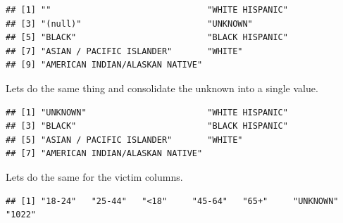 \documentclass[
]{article}
\newenvironment{Shaded}{\begin{snugshade}}{\end{snugshade}}
\newcommand{\CommentTok}[1]{\textcolor[rgb]{0.56,0.35,0.01}{\textit{#1}}}
\newcommand{\FunctionTok}[1]{\textcolor[rgb]{0.13,0.29,0.53}{\textbf{#1}}}
\newcommand{\NormalTok}[1]{#1}
\newcommand{\OtherTok}[1]{\textcolor[rgb]{0.56,0.35,0.01}{#1}}
\newcommand{\SpecialCharTok}[1]{\textcolor[rgb]{0.81,0.36,0.00}{\textbf{#1}}}
\newcommand{\StringTok}[1]{\textcolor[rgb]{0.31,0.60,0.02}{#1}}
\begin{document}
\begin{verbatim}
## [1] ""                               "WHITE HISPANIC"                
## [3] "(null)"                         "UNKNOWN"                       
## [5] "BLACK"                          "BLACK HISPANIC"                
## [7] "ASIAN / PACIFIC ISLANDER"       "WHITE"                         
## [9] "AMERICAN INDIAN/ALASKAN NATIVE"
\end{verbatim}

Lets do the same thing and consolidate the unknown into a single value.

\begin{Shaded}
\end{Shaded}

\begin{verbatim}
## [1] "UNKNOWN"                        "WHITE HISPANIC"                
## [3] "BLACK"                          "BLACK HISPANIC"                
## [5] "ASIAN / PACIFIC ISLANDER"       "WHITE"                         
## [7] "AMERICAN INDIAN/ALASKAN NATIVE"
\end{verbatim}

Lets do the same for the victim columns.

\begin{Shaded}
\end{Shaded}

\begin{verbatim}
## [1] "18-24"   "25-44"   "<18"     "45-64"   "65+"     "UNKNOWN" "1022"
\end{verbatim}
\end{document}
